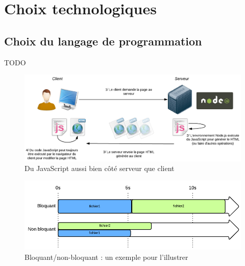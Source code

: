 \section{Choix technologiques}




\subsection*{Choix du langage de programmation}

TODO

\begin{figure}[H]
    \includegraphics[width=\textwidth,height=\textheight,keepaspectratio]{images/SchemaNodejs.png}
    \centering
    \caption[Du JavaScript aussi bien côté serveur que client]{Du JavaScript aussi bien côté serveur que client~\cite{NodejsIllustrations}}
    \label{pic:WhatIsNodeJs}
\end{figure}

\begin{figure}[H]
    \includegraphics[width=\textwidth,height=\textheight,keepaspectratio]{images/ComparaisonBloquantOuNon.png}
    \centering
    \caption[Bloquant/non-bloquant : un exemple pour l'illustrer]{Bloquant/non-bloquant : un exemple pour l'illustrer~\cite{NodejsIllustrations}}
    \label{pic:BloquantOrNot}
\end{figure}

